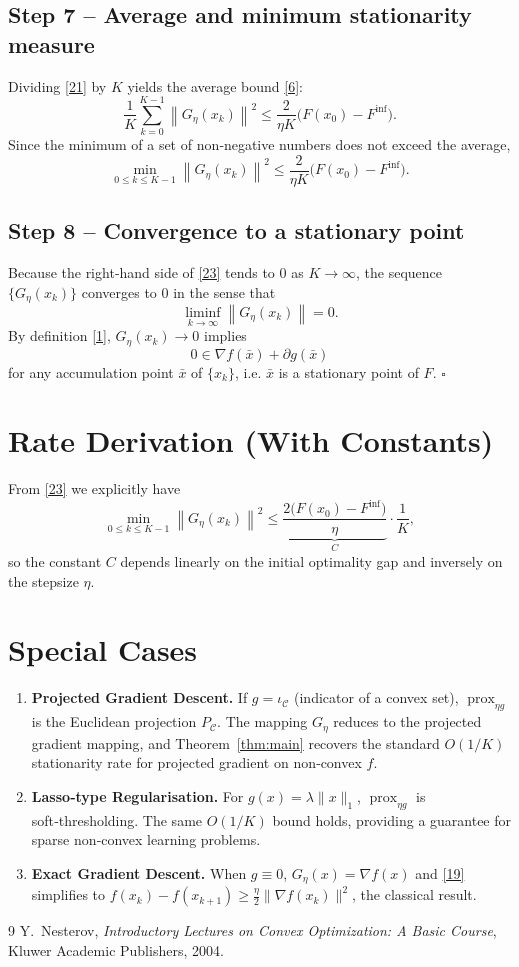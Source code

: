 \documentclass{article}
\newcommand{\prox}{\operatorname{prox}}
\newcommand{\grad}{\nabla}
\newcommand{\norm}[1]{\left\|#1\right\|}
\begin{document}
\subsection*{Step 7 – Average and minimum stationarity measure}
Dividing \eqref{21} by $K$ yields the average bound \eqref{6}:
\[
\frac{1}{K}\sum_{k=0}^{K-1}\norm{G_{\eta}(x_{k})}^{2}
\le\frac{2}{\eta K}\bigl(F(x_{0})-F^{\inf}\bigr).
\tag{22}
\]
Since the minimum of a set of non‑negative numbers does not exceed the average,
\[
\min_{0\le k\le K-1}\norm{G_{\eta}(x_{k})}^{2}
\le\frac{2}{\eta K}\bigl(F(x_{0})-F^{\inf}\bigr).
\tag{23}
\]

\subsection*{Step 8 – Convergence to a stationary point}
Because the right‑hand side of \eqref{23} tends to $0$ as $K\to\infty$, the sequence $\{G_{\eta}(x_{k})\}$ converges to $0$ in the sense that
\[
\liminf_{k\to\infty}\norm{G_{\eta}(x_{k})}=0.
\]
By definition \eqref{1}, $G_{\eta}(x_{k})\to0$ implies
\[
0\in\grad f(\bar x)+\partial g(\bar x)
\]
for any accumulation point $\bar x$ of $\{x_{k}\}$, i.e. $\bar x$ is a stationary point of $F$.
\hfill $\square$

\section*{Rate Derivation (With Constants)}
From \eqref{23} we explicitly have
\[
\min_{0\le k\le K-1}\norm{G_{\eta}(x_{k})}^{2}
\le \underbrace{\frac{2\bigl(F(x_{0})-F^{\inf}\bigr)}{\eta}}_{C}
\cdot\frac{1}{K},
\]
so the constant $C$ depends linearly on the initial optimality gap and inversely on the stepsize $\eta$.

\section*{Special Cases}
\begin{enumerate}
\item \textbf{Projected Gradient Descent.} If $g=\iota_{\mathcal C}$ (indicator of a convex set), $\prox_{\eta g}$ is the Euclidean projection $P_{\mathcal C}$. The mapping $G_{\eta}$ reduces to the projected gradient mapping, and Theorem~\ref{thm:main} recovers the standard $O(1/K)$ stationarity rate for projected gradient on non‑convex $f$.
\item \textbf{Lasso‑type Regularisation.} For $g(x)=\lambda\|x\|_{1}$, $\prox_{\eta g}$ is soft‑thresholding. The same $O(1/K)$ bound holds, providing a guarantee for sparse non‑convex learning problems.
\item \textbf{Exact Gradient Descent.} When $g\equiv0$, $G_{\eta}(x)=\grad f(x)$ and \eqref{19} simplifies to $f(x_{k})-f(x_{k+1})\ge\frac{\eta}{2}\|\grad f(x_{k})\|^{2}$, the classical result.
\end{enumerate}

\begin{thebibliography}{9}
Y.~Nesterov, \emph{Introductory Lectures on Convex Optimization: A Basic Course}, Kluwer Academic Publishers, 2004.
\end{thebibliography}
\end{document}
